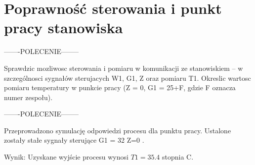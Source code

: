 \section{Poprawność sterowania i punkt pracy stanowiska}


-------POLECENIE--------

Sprawdzic mozliwosc sterowania i pomiaru w komunikacji ze stanowiskiem – w szczególnosci
sygnałów sterujacych W1, G1, Z oraz pomiaru T1. Okreslic wartosc pomiaru
temperatury w punkcie pracy (Z = 0, G1 = 25+F, gdzie F oznacza numer zespołu).

-------POLECENIE--------

Przeprowadzono symulację odpowiedzi procesu dla punktu pracy. 
Ustalone zostały stałe sygnały sterujące G1 = 32 Z=0 .

Wynik: 
Uzyskane wyjście procesu wynosi $T1=35.4$ stopnia C.

